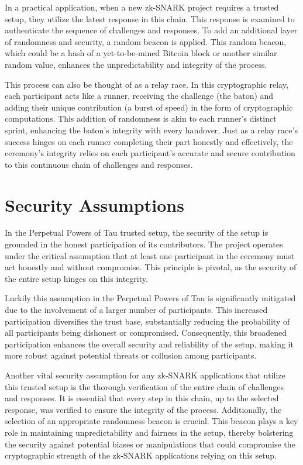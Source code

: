 \documentclass[11pt]{article}
\begin{document}
In a practical application, when a new zk-SNARK project requires a trusted setup, they utilize the latest response in this chain. This response is examined to authenticate the sequence of challenges and responses. To add an additional layer of randomness and security, a random beacon is applied. This random beacon, which could be a hash of a yet-to-be-mined Bitcoin block or another similar random value, enhances the unpredictability and integrity of the process.

This process can also be thought of as a relay race. In this cryptographic relay, each participant acts like a runner, receiving the challenge (the baton) and adding their unique contribution (a burst of speed) in the form of cryptographic computations. This addition of randomness is akin to each runner’s distinct sprint, enhancing the baton's integrity with every handover. Just as a relay race's success hinges on each runner completing their part honestly and effectively, the ceremony's integrity relies on each participant's accurate and secure contribution to this continuous chain of challenges and responses.
\section{Security Assumptions}
\label{sec:org3a610cd}

In the Perpetual Powers of Tau trusted setup, the security of the setup is grounded in the honest participation of its contributors. The project operates under the critical assumption that at least one participant in the ceremony must act honestly and without compromise. This principle is pivotal, as the security of the entire setup hinges on this integrity.

Luckily this assumption in the Perpetual Powers of Tau is significantly mitigated due to the involvement of a larger number of participants. This increased participation diversifies the trust base, substantially reducing the probability of all participants being dishonest or compromised. Consequently, this broadened participation enhances the overall security and reliability of the setup, making it more robust against potential threats or collusion among participants.

Another vital security assumption for any zk-SNARK applications that utilize this trusted setup is the thorough verification of the entire chain of challenges and responses. It is essential that every step in this chain, up to the selected response, was verified to ensure the integrity of the process. Additionally, the selection of an appropriate randomness beacon is crucial. This beacon plays a key role in maintaining unpredictability and fairness in the setup, thereby bolstering the security against potential biases or manipulations that could compromise the cryptographic strength of the zk-SNARK applications relying on this setup.
\end{document}
